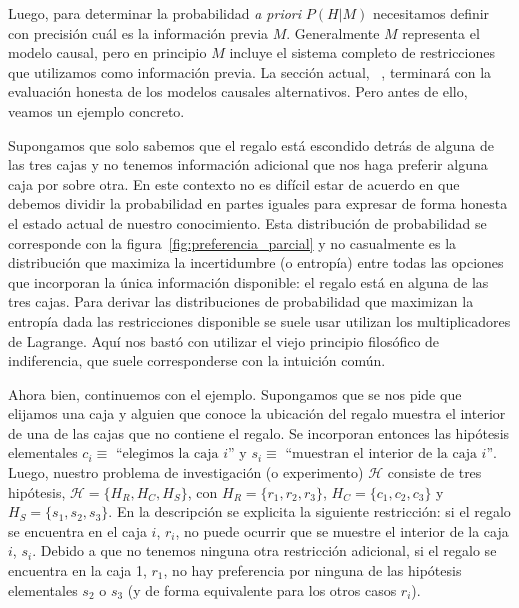 \documentclass[a4paper,11pt]{book}
\theoremstyle{definition}
\begin{document}
%
Luego, para determinar la probabilidad \emph{a priori} $P(H|M)$ necesitamos definir con precisión cuál es la información previa $M$.
%
Generalmente $M$ representa el modelo causal, pero en principio $M$ incluye el sistema completo de restricciones que utilizamos como información previa.
%
La sección actual,~ \emph{}, terminará con la evaluación honesta de los modelos causales alternativos.
%
Pero antes de ello, veamos un ejemplo concreto.


Supongamos que solo sabemos que el regalo está escondido detrás de alguna de las tres cajas y no tenemos información adicional que nos haga preferir alguna caja por sobre otra.
%
En este contexto no es dif\'icil estar de acuerdo en que debemos dividir la probabilidad en partes iguales para expresar de forma honesta el estado actual de nuestro conocimiento.
%
Esta distribución de probabilidad se corresponde con la figura~\ref{fig:preferencia_parcial} y no casualmente es la distribución que maximiza la incertidumbre (o entrop\'ia) entre todas las opciones que incorporan la única información disponible: el regalo está en alguna de las tres cajas.
%
Para derivar las distribuciones de probabilidad que maximizan la entrop\'ia dada las restricciones disponible se suele usar utilizan los multiplicadores de Lagrange.
%
Aqu\'i nos bastó con utilizar el viejo principio filosófico de indiferencia, que suele corresponderse con la intuición común.


Ahora bien, continuemos con el ejemplo.
%
Supongamos que se nos pide que elijamos una caja y alguien que conoce la ubicación del regalo muestra el interior de una de las cajas que no contiene el regalo.
%
Se incorporan entonces las hipótesis elementales $c_i \equiv \text{ ``elegimos la caja $i$''}$ y $s_i \equiv \text{ ``muestran el interior de la caja $i$''}$.
%
Luego, nuestro problema de investigación (o experimento) $\mathcal{H}$ consiste de tres hipótesis, $\mathcal{H} = \{H_R, H_C, H_S\}$, con $H_R=\{r_1, r_2, r_3\}$, $H_C=\{c_1, c_2, c_3\}$ y $H_S=\{s_1, s_2, s_3\}$.
%
En la descripción se explicita la siguiente restricción: si el regalo se encuentra en el caja $i$, $r_i$, no puede ocurrir que se muestre el interior de la caja $i$, $s_i$.
%
Debido a que no tenemos ninguna otra restricción adicional, si el regalo se encuentra en la caja 1, $r_1$, no hay preferencia por ninguna de las hipótesis elementales $s_2$ o $s_3$ (y de forma equivalente para los otros casos $r_i$).
\end{document}
